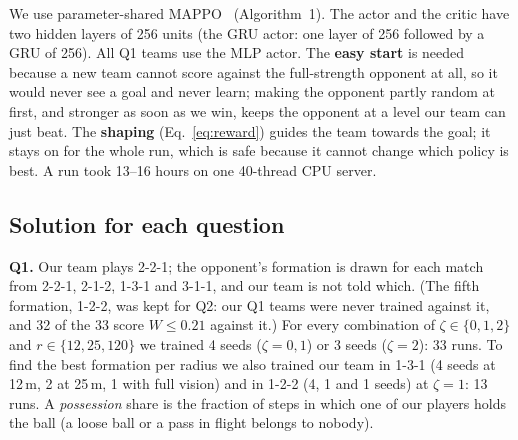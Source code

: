 \documentclass{article}
\begin{document}
We use parameter-shared MAPPO~\cite{yu2022mappo} (Algorithm~1). The actor and the critic have two hidden layers of 256 units (the GRU actor: one layer of 256 followed by a GRU of
256). All Q1 teams use the MLP actor. The
\textbf{easy start} is needed because a new team cannot score against the full-strength opponent at all, so it would
never see a goal and never learn; making the opponent partly random at first, and stronger as soon as we win, keeps the
opponent at a level our team can just beat. The \textbf{shaping} (Eq.~\ref{eq:reward}) guides the team towards the
goal; it stays on for the whole run, which is safe because it cannot change which policy is best. A
run took 13--16 hours on one 40-thread CPU server.

\subsection{Solution for each question}
\label{sec:m-q}

\textbf{Q1.} Our team plays 2-2-1; the opponent's formation is drawn for each match from 2-2-1, 2-1-2, 1-3-1 and
3-1-1, and our team is not told which. (The fifth formation, 1-2-2, was kept for Q2: our Q1 teams were never trained against it, and 32 of the 33 score
$W\le0.21$ against it.) For every
combination of $\zeta\in\{0,1,2\}$ and $r\in\{12,25,120\}$ we trained 4 seeds ($\zeta=0,1$) or 3 seeds ($\zeta=2$):
33 runs. To find the best formation per radius we also trained our team in 1-3-1 (4 seeds at 12\,m, 2 at 25\,m, 1 with full
vision) and in 1-2-2 (4, 1 and 1 seeds) at $\zeta=1$: 13 runs. A \emph{possession} share is the fraction of steps in
which one of our players holds the ball (a loose ball or a pass in flight belongs to nobody).
\end{document}
